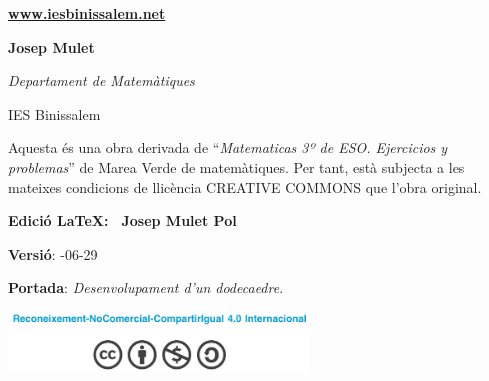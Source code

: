 \begin{center}
\begin{minipage}{0.4\textwidth}
\begin{center}
	\small
	
	\noindent \href{www.iesbinissalem.net}{\textbf{www.iesbinissalem.net}}  
 
\end{center}
\end{minipage}
\begin{minipage}{0.4\textwidth}
\begin{flushright}
\textbf{Josep Mulet}

\textit{Departament de Matemàtiques} 

 IES Binissalem
\end{flushright}
\end{minipage} 


\end{center}

\newpage

\vspace*{12.5cm}
 \begin{center}
 	\begin{minipage}{0.5\textwidth}
 		Aquesta és una obra derivada de ``\textit{Matematicas 3º de ESO. Ejercicios y problemas}'' de Marea Verde de matemàtiques. Per tant, està subjecta a les mateixes condicions de llicència CREATIVE COMMONS que l'obra original.
 		
 		 \noindent \textbf{Edició \LaTeX: \quad \textregistered \,  Josep Mulet Pol}
 		
 		 \noindent \textbf{Versió}: -06-29
 		 
 		 \noindent \textbf{Portada}: \quad \textit{Desenvolupament d'un dodecaedre}.
 		 
 		
 		\begin{center}
 		\includegraphics*[width=8cm]{img-00/licencia}
 		\end{center}
 	\end{minipage}
 \end{center}
 

\renewcommand{\thepage}{\Roman{page}}%
\pagestyle{myheadings}
\thispagestyle{empty}
\renewcommand{\headrulewidth}{0pt}
\renewcommand{\footrulewidth}{0pt}

\pagebreak


